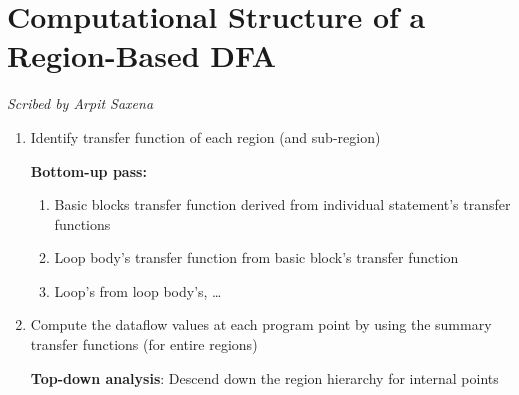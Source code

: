 \section{Computational Structure of a Region-Based DFA}
\FloatBarrier
\begin{flushright}
    \textit{Scribed by Arpit Saxena}
\end{flushright}

\begin{enumerate}
    \item {
        Identify transfer function of each region (and sub-region)

        \textbf{Bottom-up pass:}
        \begin{enumerate}
            \item Basic blocks transfer function derived from individual 
            statement's transfer functions 
            \item Loop body's transfer function from basic block's transfer 
            function
            \item Loop's from loop body's, \ldots
        \end{enumerate}
    }
    \item {
        Compute the dataflow values at each program point by using the summary
        transfer functions (for entire regions)

        \textbf{Top-down analysis}: Descend down the region hierarchy
        for internal points
    }

    
\end{enumerate}

